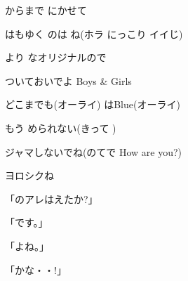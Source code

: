 \documentclass[14pt]{ltjsarticle}
\begin{document}
{\item
  からまで にかせて
  \jisho{}

  はもゆく のは ね(ホラ にっこり イイじ)
  \jisho{}

  より なオリジナルので
  \jisho{}

  ついておいでよ Boys \& Girls
  \jisho{}

  どこまでも(オーライ) はBlue(オーライ)
  \jisho{}

  もう められない(きって )
  \jisho{}

  ジャマしないでね(のてで How are you?)
  \jisho{}

  ヨロシクね
  \jisho{}

\item
  \mbox「のアレはえたか?」
  \jisho{}

  「です。」
  \jisho{}

  「よね。」
  \jisho{}

  「かな・・!」
  \jisho{}

}
\end{document}
